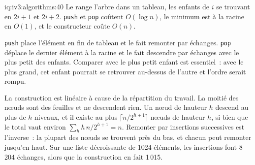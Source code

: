 \begin{solution}{iq:iv3:algorithms:40}
Le  range l'arbre dans un tableau, les enfants de $i$ se trouvant en $2i + 1$ et $2i + 2$. \texttt{push} et \texttt{pop} coûtent $O(\log n)$, le minimum est à la racine en $O(1)$, et le constructeur coûte $O(n)$.
\label{lst:iv3:al:heap}

\texttt{push} place l'élément en fin de tableau et le fait remonter par échanges. \texttt{pop} déplace le dernier élément à la racine et le fait descendre par échanges avec le plus petit des enfants. Comparer avec le plus petit enfant est essentiel~: avec le plus grand, cet enfant pourrait se retrouver au-dessus de l'autre et l'ordre serait rompu.

La construction est linéaire à cause de la répartition du travail. La moitié des nœuds sont des feuilles et ne descendent rien. Un nœud de hauteur $h$ descend au plus de $h$ niveaux, et il existe au plus $\lceil n/2^{h+1} \rceil$ nœuds de hauteur $h$, si bien que le total vaut environ $\sum_h h\,n/2^{h+1} = n$. Remonter par insertions successives est l'inverse~: la plupart des nœuds se trouvent près du bas, et chacun peut remonter jusqu'en haut. Sur une liste décroissante de 1024 éléments, les insertions font 8\,204 échanges, alors que la construction en fait 1\,015.

\end{solution}


